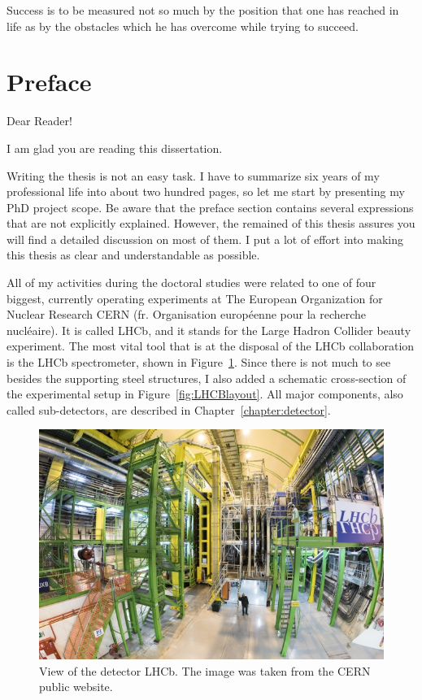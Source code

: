 \begin{savequote}[75mm] 
Success is to be measured not so much by the position that one has reached in life as by the obstacles which he has overcome while trying to succeed.
\end{savequote}



\chapter*{Preface}
\label{introduction}

Dear Reader! 

I am glad you are reading this dissertation.  

Writing the thesis is not an easy task. I have to summarize six years of my professional life into about two hundred pages, so let me start by presenting my PhD project scope.  Be aware that the preface section contains several expressions that are not explicitly explained. However, the remained of this thesis assures you will find a detailed discussion on most of them. I put a lot of effort into making this thesis as clear and understandable as possible. 

All of my activities during the doctoral studies were related to one of four biggest, currently operating experiments at The European Organization for Nuclear Research CERN (fr.  Organisation européenne pour la recherche nucléaire).  It is called LHCb, and it stands for the Large Hadron Collider beauty experiment. The most vital tool that is at the disposal of the LHCb collaboration is the LHCb spectrometer, shown in Figure~\ref{fig:LHCBphoto}. Since there is not much to see besides the supporting steel structures, I also added a schematic cross-section of the experimental setup in Figure~\ref{fig:LHCBlayout}. All major components, also called sub-detectors, are described in Chapter~\ref{chapter:detector}. 


\begin{figure}[!hb]
\centering
\includegraphics[width=\textwidth]{figures/LHCB_photo}
\caption{View of the detector LHCb. The image was taken from the CERN public website. 
\label{fig:LHCBphoto}}
\end{figure}

